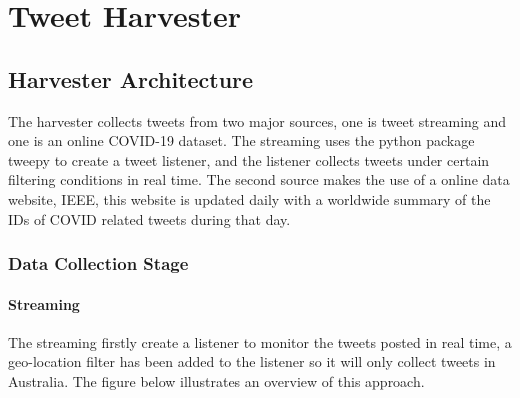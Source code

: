 \section{Tweet Harvester}
\subsection{Harvester Architecture}

The harvester collects tweets from two major sources, one is tweet streaming and one is an online COVID-19 dataset. The streaming uses the python package tweepy to create a tweet listener, and the listener collects tweets under certain filtering conditions in real time. The second source makes the use of a online data website, IEEE, this website is updated daily with a worldwide summary of the IDs of COVID related tweets during that day.
\subsubsection{Data Collection Stage}
\paragraph{Streaming}

The streaming firstly create a listener to monitor the tweets posted in real time, a geo-location filter has been added to the listener so it will only collect tweets in Australia. The figure below illustrates an overview of this approach. 

